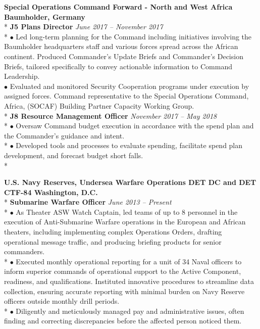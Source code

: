 \documentclass{article}
\begin{document}
\noindent \textbf{Special Operations Command Forward - North and West Africa \hfill Baumholder, Germany} \\*
\textbf{J5 Plans Director} \hfill \textit{June 2017 -- November 2017} \\*
$\bullet$ Led long-term planning for the Command including initiatives involving the Baumholder headquarters staff and various forces spread across the African continent. Produced Commander's Update Briefs and Commander's Decision Briefs, tailored specifically to convey actionable information to Command Leadership.\\
\noindent $\bullet$ Evaluated and monitored Security Cooperation programs under execution by assigned forces. Command representative to the Special Operations Command, Africa, (SOCAF) Building Partner Capacity Working Group.\\*
\noindent \textbf{J8 Resource Management Officer} \hfill \textit{November 2017 -- May 2018} \\*
\noindent $\bullet$ Oversaw Command budget execution in accordance with the spend plan and the Commander's guidance and intent.\\*
\noindent $\bullet$ Developed tools and processes to evaluate spending, facilitate spend plan development, and forecast budget short falls.\\*

\noindent \textbf{U.S. Navy Reserves, Undersea Warfare Operations DET DC and DET CTF-84 \hfill Washington, D.C.} \\*
\textbf{Submarine Warfare Officer} \hfill \textit{June 2013 -- Present} \\*
\noindent $\bullet$ As Theater ASW Watch Captain, led teams of up to 8 personnel in the execution of Anti-Submarine Warfare operations in the European and African theaters, including implementing complex Operations Orders, drafting operational message traffic, and producing briefing products for senior commanders. \\*
$\bullet$ Executed monthly operational reporting for a unit of 34 Naval officers to inform superior commands of operational support to the Active Component, readiness, and qualifications. Instituted innovative procedures to streamline data collection, ensuring accurate reporting with minimal burden on Navy Reserve officers outside monthly drill periods. \\*
$\bullet$ Diligently and meticulously managed pay and administrative issues, often finding and correcting discrepancies before the affected person noticed them. \\
\end{document}
